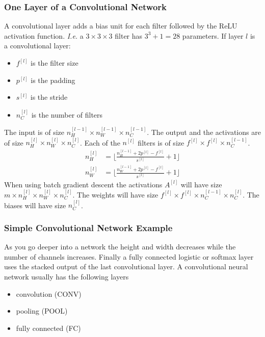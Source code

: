 \documentclass{article}
\begin{document}
\subsubsection{One Layer of a Convolutional Network}
A convolutional layer adds a bias unit for each filter followed by the ReLU activation function.
\emph{I.e.} a $3\times 3\times 3$ filter has $3^3+1=28$ parameters.
If layer $l$ is a convolutional layer:
\begin{itemize}
  \item $f^{[l]}$ is the filter size
  \item $p^{[l]}$ is the padding
  \item $s^{[l]}$ is the stride
  \item $n^{[l]}_C$ is the number of filters
\end{itemize}
The input is of size $n^{[l-1]}_H\times n^{[l-1]}_W\times n^{[l-1]}_C$.
The output and the activations are of size $n^{[l]}_H\times n^{[l]}_W\times n^{[l]}_C$.
Each of the $n^{[l]}$ filters is of size $f^{[l]}\times f^{[l]}\times n^{[l-1]}_C$.
\begin{equation}
  \begin{split}
    n^{[l]}_H&=\lfloor\frac{n^{[l-1]}_H+2p^{[l]}-f^{[l]}}{s^{[l]}}+1\rfloor\\
    n^{[l]}_W&=\lfloor\frac{n^{[l-1]}_W+2p^{[l]}-f^{[l]}}{s^{[l]}}+1\rfloor
  \end{split}
\end{equation}
When using batch gradient descent the activations $A^{[l]}$ will have size
$m\times n^{[l]}_H\times n^{[l]}_W\times n^{[l]}_C$.
The weights will have size $f^{[l]}\times f^{[l]}\times n^{[l-1]}_C\times n^{[l]}_C$.
The biases will have size $n^{[l]}_C$.

\subsubsection{Simple Convolutional Network Example}
As you go deeper into a network the height and width decreases while the number of channels increases.
Finally a fully connected logistic or softmax layer uses the stacked output of the last convolutional layer.
A convolutional neural network usually has the following layers
\begin{itemize}
  \item convolution (CONV)
  \item pooling (POOL)
  \item fully connected (FC)
\end{itemize}
\end{document}
